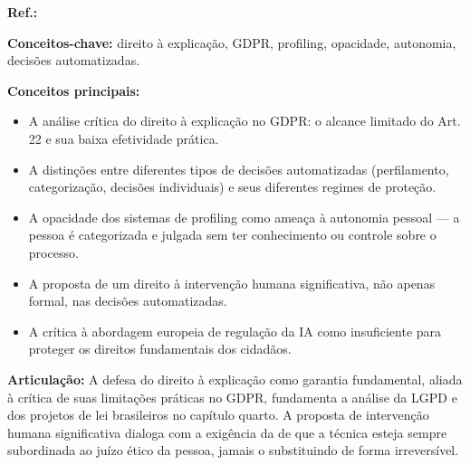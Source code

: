 \begin{fichamento}
    \textbf{Ref.:} \cite{Edwards2017PC}
    
    \textbf{Conceitos-chave:} direito à explicação, GDPR, profiling, opacidade, autonomia, decisões automatizadas.
    
    \textbf{Conceitos principais:}
    \begin{itemize}
        \item A análise crítica do direito à explicação no GDPR: o alcance limitado do Art. 22 e sua baixa efetividade prática.
        \item A distinções entre diferentes tipos de decisões automatizadas (perfilamento, categorização, decisões individuais) e seus diferentes regimes de proteção.
        \item A opacidade dos sistemas de profiling como ameaça à autonomia pessoal — a pessoa é categorizada e julgada sem ter conhecimento ou controle sobre o processo.
        \item A proposta de um direito à intervenção humana significativa, não apenas formal, nas decisões automatizadas.
        \item A crítica à abordagem europeia de regulação da IA como insuficiente para proteger os direitos fundamentais dos cidadãos.
    \end{itemize}
    
    \textbf{Articulação:} A defesa do direito à explicação como garantia fundamental, aliada à crítica de suas limitações práticas no GDPR, fundamenta a análise da LGPD e dos projetos de lei brasileiros no capítulo quarto. A proposta de intervenção humana significativa dialoga com a exigência da \MH{} de que a técnica esteja sempre subordinada ao juízo ético da pessoa, jamais o substituindo de forma irreversível.
\end{fichamento}

